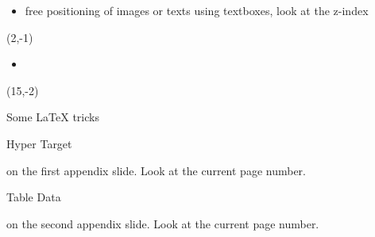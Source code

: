 \documentclass[11pt, a4paper, landscape]{article}
\begin{document}
\NewPage{}
\vfill
\begin{itemize}
\item free positioning of images or texts using textboxes, look at the z-index
\end{itemize}
\vfill
\begin{textblock}{4}(2,-1) %
\end{textblock} 
\begin{itemize}
\item {}
\end{itemize}
\begin{textblock}{4}(15,-2) %
\end{textblock} 
\vfill






\NewPage{}
\vfill
Some \LaTeX\xspace tricks
\vfill




\FinalPage



\NewPage



\appendix
\NewPage{}
\vfill
\hypertarget{anchorname}{Hyper Target} on the first appendix slide. 
Look at the current page number.
\vfill

\NewPage{}
\vfill
\hypertarget{table_data}{Table Data} on the second appendix slide.
Look at the current page number.
\vfill
\end{document}
